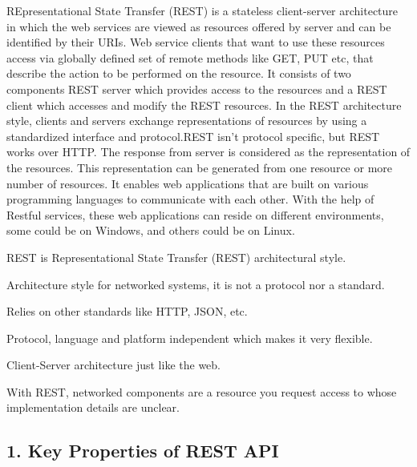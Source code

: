 R\+Epresentational State Transfer (R\+E\+ST) is a stateless client-\/server architecture in which the web services are viewed as resources offered by server and can be identified by their U\+R\+Is. Web service clients that want to use these resources access via globally defined set of remote methods like G\+ET, P\+UT etc, that describe the action to be performed on the resource. It consists of two components R\+E\+ST server which provides access to the resources and a R\+E\+ST client which accesses and modify the R\+E\+ST resources. In the R\+E\+ST architecture style, clients and servers exchange representations of resources by using a standardized interface and protocol.\+R\+E\+ST isn’t protocol specific, but R\+E\+ST works over H\+T\+TP. The response from server is considered as the representation of the resources. This representation can be generated from one resource or more number of resources. It enables web applications that are built on various programming languages to communicate with each other. With the help of Restful services, these web applications can reside on different environments, some could be on Windows, and others could be on Linux. 
\begin{DoxyItemize}
\item R\+E\+ST is Representational State Transfer (R\+E\+ST) architectural style.
\item Architecture style for networked systems, it is not a protocol nor a standard.
\item Relies on other standards like H\+T\+TP, J\+S\+ON, etc.
\item Protocol, language and platform independent which makes it very flexible.
\item Client-\/\+Server architecture just like the web.
\item With R\+E\+ST, networked components are a resource you request access to whose implementation details are unclear.
\end{DoxyItemize}

\subsection*{1. Key Properties of R\+E\+ST A\+PI}


